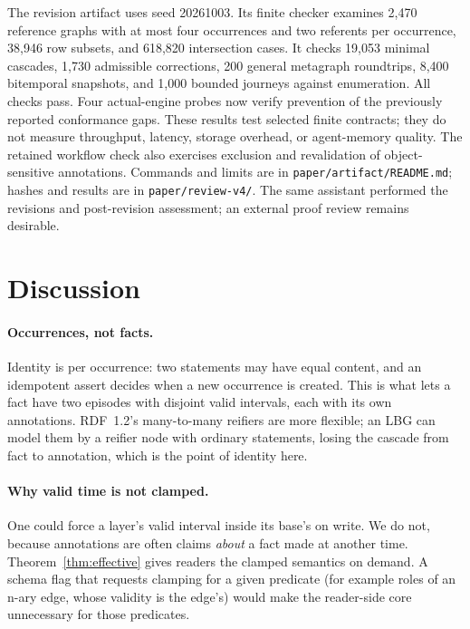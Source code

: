 \documentclass[11pt]{article}
\theoremstyle{plain}
\theoremstyle{definition}
\theoremstyle{remark}
\begin{document}
The revision artifact uses seed 20261003. Its finite checker examines 2,470
reference graphs with at most four occurrences and two referents per occurrence,
38,946 row subsets, and 618,820 intersection cases. It checks 19,053 minimal
cascades, 1,730 admissible corrections, 200 general metagraph roundtrips,
8,400 bitemporal snapshots, and 1,000 bounded journeys against enumeration.
All checks pass. Four actual-engine probes now verify prevention of the
previously reported conformance gaps. These results test selected finite contracts; they do not measure
throughput, latency, storage overhead, or agent-memory quality.
The retained workflow check also exercises exclusion and revalidation of
object-sensitive annotations. Commands and limits are in
\texttt{paper/artifact/README.md}; hashes and results are in
\texttt{paper/review-v4/}. The same assistant performed the revisions and
post-revision assessment; an external proof review remains desirable.

\section{Discussion}\label{sec:discussion}

\paragraph{Occurrences, not facts.} Identity is per occurrence: two statements may
have equal content, and an idempotent assert decides when a new occurrence is
created. This is what lets a fact have two episodes with disjoint valid intervals,
each with its own annotations. RDF~1.2's many-to-many reifiers are more flexible;
an LBG can model them by a reifier node with ordinary statements, losing the
cascade from fact to annotation, which is the point of identity here.

\paragraph{Why valid time is not clamped.} One could force a layer's valid interval
inside its base's on write. We do not, because annotations are often claims
\emph{about} a fact made at another time. Theorem~\ref{thm:effective} gives readers
the clamped semantics on demand. A schema flag that requests clamping for a given
predicate (for example roles of an n-ary edge, whose validity is the edge's) would
make the reader-side core unnecessary for those predicates.
\end{document}
